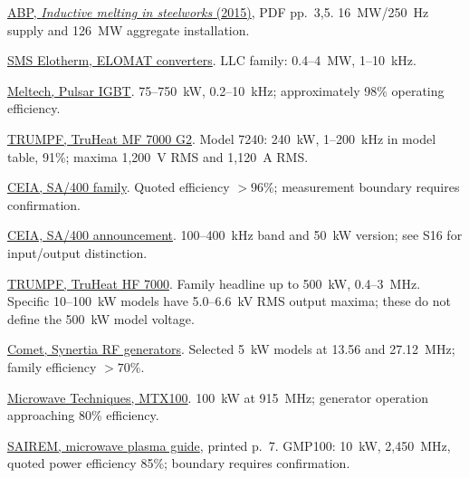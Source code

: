 \documentclass[10pt,a4paper]{article}
\begin{document}
\begin{description}
\setlength{\itemsep}{2pt}
\item[S1] \href{https://abpinduction.com/wp-content/uploads/2020/02/ABP-Inductive_melting_in_steelworks_M._Chaabet_E._Doetsch.pdf}{ABP, \emph{Inductive melting in steelworks} (2015)}, PDF pp.~3,5. 16~MW/250~Hz supply and 126~MW aggregate installation.
\item[S2] \href{https://www.sms-elotherm.com/en/service/retrofit/converters}{SMS Elotherm, ELOMAT converters}. LLC family: 0.4--4~MW, 1--10~kHz.
\item[S3] \href{https://www.induction-furnaces.com/new-furnaces/pulsar-igbt-inverter-technology/}{Meltech, Pulsar IGBT}. 75--750~kW, 0.2--10~kHz; approximately 98\% operating efficiency.
\item[S4] \href{https://www.trumpf.com/en_US/products/power-electronics/generators-for-industrial-heating/truheat-mf/truheat-mf-serie-7000-g2/}{TRUMPF, TruHeat MF 7000 G2}. Model 7240: 240~kW, 1--200~kHz in model table, 91\%; maxima 1,200~V RMS and 1,120~A RMS.
\item[S5] \href{https://induction.ceia.net/en-IT/product/power-cube-sa-400-series}{CEIA, SA/400 family}. Quoted efficiency $>96\%$; measurement boundary requires confirmation.
\item[S6] \href{https://induction.ceia.net/es-EC/about-us/news/48}{CEIA, SA/400 announcement}. 100--400~kHz band and 50~kW version; see S16 for input/output distinction.
\item[S7] \href{https://www.trumpf.com/de_DE/produkte/leistungselektronik/generatoren-zur-industriellen-erwaermung/truheat-hf/truheat-hf-serie-7000/}{TRUMPF, TruHeat HF 7000}. Family headline up to 500~kW, 0.4--3~MHz. Specific 10--100~kW models have 5.0--6.6~kV RMS output maxima; these do not define the 500~kW model voltage.
\item[S8] \href{https://pct.comet.tech/en/products/synertia_rf_power_delivery_platform/synertia_rf_generator}{Comet, Synertia RF generators}. Selected 5~kW models at 13.56 and 27.12~MHz; family efficiency $>70\%$.
\item[S9] \href{https://www.microwavetechniques.com/industrial-microwave-generators/100-kw-mtx/}{Microwave Techniques, MTX100}. 100~kW at 915~MHz; generator operation approaching 80\% efficiency.
\item[S10] \href{https://www.sairem.com/wp-content/uploads/2021/01/SAIREM-MW-technology-guide-for-lab-grown-diamonds-applications.pdf}{SAIREM, microwave plasma guide}, printed p.~7. GMP100: 10~kW, 2,450~MHz, quoted power efficiency 85\%; boundary requires confirmation.

\end{description}
\end{document}

